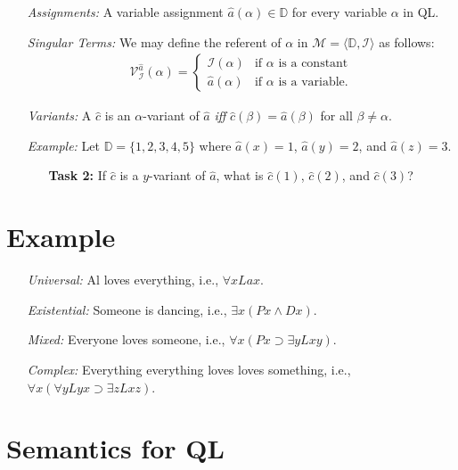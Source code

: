 \documentclass[a4paper, 11pt]{article} %
\newcommand{\tuple}[1]{\langle#1\rangle} %
\newcommand{\set}[1]{\lbrace#1\rbrace} %
\newcommand{\I}{\mathcal{I}}
\newcommand{\M}{\mathcal{M}}
\newcommand{\D}{\mathbb{D}}
\newcommand{\VV}[2]{\mathcal{V}_{#1}^{#2}} %
\begin{document}
\begin{enumerate}
  \item[\it Assignments:] A variable assignment $\hat{a}(\alpha)\in\D$ for every variable $\alpha$ in QL.
  \item[\it Singular Terms:] We may define the referent of $\alpha$ in $\M=\tuple{\D,\I}$ as follows:\\
    \begin{align*}
      \VV{\I}{\hat{a}}{(\alpha)}=
        \begin{cases}
          \I(\alpha) & \text{if } \alpha \text{ is a constant} \\
          \hat{a}(\alpha) & \text{if } \alpha \text{ is a variable.}
        \end{cases}
    \end{align*}
  \item[\it Variants:] A $\hat{c}$ is an $\alpha$-variant of $\hat{a}$ \textit{iff} $\hat{c}(\beta)=\hat{a}(\beta)$ for all $\beta\neq\alpha$.
  \item[\it Example:] Let $\D=\set{1,2,3,4,5}$ where $\hat{a}(x)=1$, $\hat{a}(y)=2$, and $\hat{a}(z)=3$.
    \begin{itemize}
      \item[\bf Task 2:] If $\hat{c}$ is a $y$-variant of $\hat{a}$, what is $\hat{c}(1)$, $\hat{c}(2)$, and $\hat{c}(3)$?
    \end{itemize}
\end{enumerate}



\section*{Example}

\begin{enumerate}
  \item[\it Universal:] Al loves everything, i.e., $\forall xLax$.
  \item[\it Existential:] Someone is dancing, i.e., $\exists x(Px \wedge Dx)$.
  \item[\it Mixed:] Everyone loves someone, i.e., $\forall x(Px \supset \exists yLxy)$. 
  \item[\it Complex:] Everything everything loves loves something, i.e., $\forall x(\forall yLyx \supset \exists zLxz)$.
\end{enumerate}



\section*{Semantics for QL}
\end{document}
